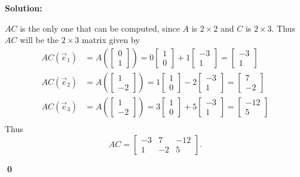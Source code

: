 \documentclass{article}
\newenvironment{solution}
{
  \ignorespaces
  \textbf{Solution:}
}
{
  \ignorespacesafterend
  \begin{flushright}
  {\bfseries \qed}
  \end{flushright}
}
\begin{document}
\begin{solution}
\(AC\) is the only one that can be computed, since \(A\) is \(2\times 2\)
and \(C\) is \(2\times 3\). Thus \(AC\) will be the \(2\times 3\) matrix
given by
\begin{align*}
AC\left( \vec{e}_1 \right) &= A \left( \begin{bmatrix} 0 \\ 1 \end{bmatrix} \right) = 0 \begin{bmatrix} 1 \\ 0 \end{bmatrix} + 1\begin{bmatrix} -3 \\ 1 \end{bmatrix} = \begin{bmatrix} -3 \\ 1 \end{bmatrix} \\
AC\left( \vec{e}_2 \right) &= A \left( \begin{bmatrix} 1 \\ -2 \end{bmatrix} \right) = 1 \begin{bmatrix} 1 \\ 0 \end{bmatrix} -2\begin{bmatrix} -3 \\ 1 \end{bmatrix} = \begin{bmatrix} 7 \\ -2 \end{bmatrix} \\
AC\left( \vec{e}_3 \right) &= A \left( \begin{bmatrix} 1 \\ -2 \end{bmatrix} \right) = 3 \begin{bmatrix} 1 \\ 0 \end{bmatrix} + 5\begin{bmatrix} -3 \\ 1 \end{bmatrix} = \begin{bmatrix} -12 \\ 5 \end{bmatrix} \\
\end{align*}
Thus
$$AC = \begin{bmatrix} -3 & 7 & -12 \\ 1 & -2 & 5 \end{bmatrix}.$$
\end{solution}
\end{document}

